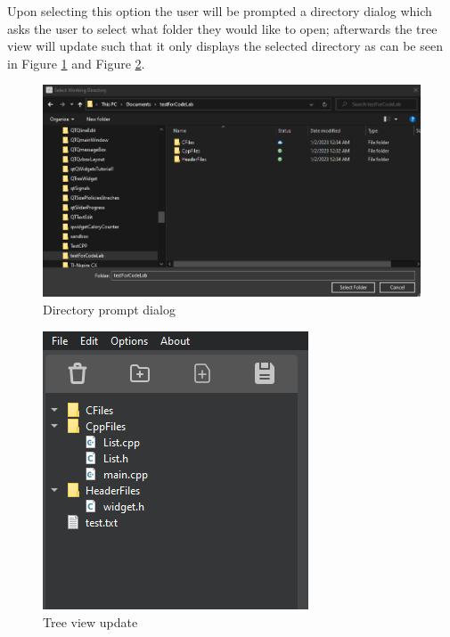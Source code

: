 \documentclass[a4paper, 11pt]{article}
\begin{document}
				\noindent Upon selecting this option the user will be prompted a directory dialog which asks the user to select what folder they would like to open; afterwards the tree view will update such that it only displays the selected directory as can be seen in Figure \ref{Fig:Directory prompt dialog} and Figure \ref{Fig:Tree view update}.
				
				\begin{figure}[h]
					\centering
					\includegraphics[width = .9\linewidth]{directoryDialogPromt}
					\caption{Directory prompt dialog}
					\label{Fig:Directory prompt dialog}
				\end{figure}
				\pagebreak
				
				\begin{figure}[h]
					\centering
					\includegraphics[width = .3\linewidth]{updatedTreeView}
					\caption{Tree view update}
					\label{Fig:Tree view update}
				\end{figure}
\end{document}

